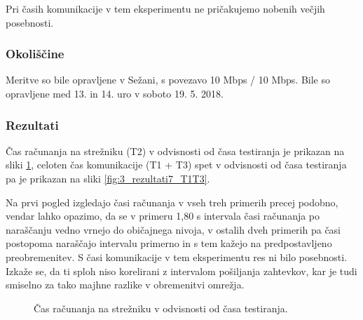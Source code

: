 Pri časih komunikacije v tem eksperimentu ne pričakujemo nobenih večjih posebnosti.

\subsubsection{Okoliščine}

Meritve so bile opravljene v Sežani, s povezavo 10 Mbps / 10 Mbps.
Bile so opravljene med 13. in 14. uro v soboto 19. 5. 2018.

\subsubsection{Rezultati}

Čas računanja na strežniku (T2) v odvisnosti od časa testiranja je prikazan na sliki \ref{fig:3_rezultati7_T2}, celoten čas komunikacije (T1 + T3) spet v odvisnosti od časa testiranja pa je prikazan na sliki \ref{fig:3_rezultati7_T1T3}.

Na prvi pogled izgledajo časi računanja v vseh treh primerih precej podobno, vendar lahko opazimo, da se v primeru 1,80 s intervala časi računanja po naraščanju vedno vrnejo do običajnega nivoja, v ostalih dveh primerih pa časi postopoma naraščajo intervalu primerno in s tem kažejo na predpostavljeno preobremenitev.
S časi komunikacije v tem eksperimentu res ni bilo posebnosti.
Izkaže se, da ti sploh niso korelirani z intervalom pošiljanja zahtevkov, kar je tudi smiselno za tako majhne razlike v obremenitvi omrežja.


\begin{figure}[H]
    \caption{Čas računanja na strežniku v odvisnosti od časa testiranja.}
    \label{fig:3_rezultati7_T2}
\end{figure}

